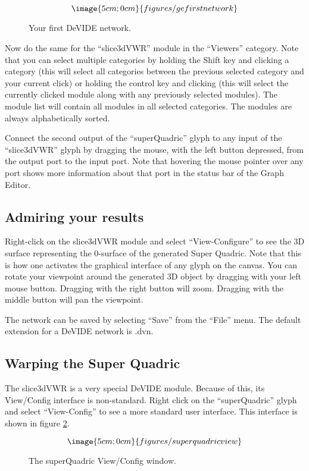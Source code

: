\begin{figure}
$$\image{5cm;0cm}{figures/gefirstnetwork}$$
\caption{Your first DeVIDE network.}\label{figGFN}
\end{figure}

Now do the same for the ``slice3dVWR'' module in the ``Viewers''
category.  Note that you can select multiple categories by holding the
Shift key and clicking a category (this will select all categories between the
previous selected category and your current click) or holding the
control key and clicking (this will select the currently clicked
module along with any previously selected modules).  The module list
will contain all modules in all selected categories.  The modules are
always alphabetically sorted.

Connect the second output of the ``superQuadric'' glyph to any input
of the ``slice3dVWR'' glyph by dragging the mouse, with the left
button depressed, from the output port to the input port.  Note that
hovering the mouse pointer over any port shows more information about
that port in the status bar of the Graph Editor.

\subsection{Admiring your results}
Right-click on the slice3dVWR module and select ``View-Configure'' to
see the 3D surface representing the 0-surface of the generated Super
Quadric.  Note that this is how one activates the graphical interface
of any glyph on the canvas.  You can rotate your viewpoint around the
generated 3D object by dragging with your left mouse button.  Dragging
with the right button will zoom.  Dragging with the middle button will
pan the viewpoint.

The network can be saved by selecting ``Save'' from the ``File''
menu.  The default extension for a DeVIDE network is .dvn.

\subsection{Warping the Super Quadric}
The slice3dVWR is a very special DeVIDE module.  Because of this, its
View/Config interface is non-standard.  Right click on the
``superQuadric'' glyph and select ``View-Config'' to see a more
standard user interface.  This interface is shown in figure
\ref{figSuperQuadricView}.

\begin{figure}
$$\image{5cm;0cm}{figures/superquadricview}$$
\caption{The superQuadric View/Config window.}\label{figSuperQuadricView}
\end{figure}

